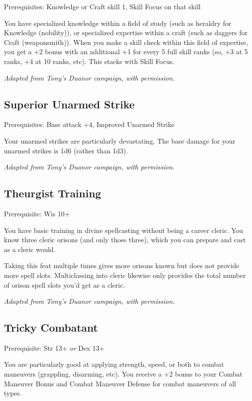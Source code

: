 Prerequisites: Knowledge or Craft skill 1, Skill Focus on that skill

You have specialized knowledge within a field of study (such as heraldry
for Knowledge (nobility)), or specialized expertise within a craft (such as
daggers for Craft (weaponsmith)). When you make a skill check within this
field of expertise, you get a +2 bonus with an additional +1 for every
5 full skill ranks (so, +3 at 5 ranks, +4 at 10 ranks, etc). This stacks
with Skill Focus.

\textit{Adapted from Tony's Duanor campaign, with permission.}
%

%
\subsection{Superior Unarmed Strike}

Prerequisites: Base attack +4, Improved Unarmed Strike

Your unarmed strikes are particularly devastating. The base damage for
your unarmed strikes is 1d6 (rather than 1d3).

\textit{Adapted from Tony's Duanor campaign, with permission.}
%

%
\subsection{Theurgist Training}

Prerequisite: Wis 10+

You have basic training in divine spellcasting without being a career
cleric. You know three cleric orisons (and only those three), which you
can prepare and cast as a cleric would.

Taking this feat multiple times gives more orisons known but does not
provide more spell slots. Multiclassing into cleric likewise only provides
the total number of orison spell slots you'd get as a cleric.

\textit{Adapted from Tony's Duanor campaign, with permission.}
%

%
\subsection{Tricky Combatant}

Prerequisite: Str 13+ \textit{or} Dex 13+

You are particularly good at applying strength, speed, or both to combat
maneuvers (grappling, disarming, etc). You receive a +2 bonus to your
Combat Maneuver Bonus and Combat Maneuver Defense for combat maneuvers of
all types.

